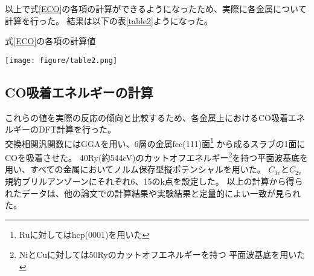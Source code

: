 \documentclass[12pt]{ltjsarticle}
\begin{document}
以上で式\ref{ECO}の各項の計算ができるようになったため、実際に各金属について計算を行った。
結果は以下の表\ref{table2}ようになった。
\begin{table}[hbtp]
    \begin{center}
    \caption{式\ref{ECO}の各項の計算値}
     \texttt{[image: figure/table2.png]}
    \end{center}
    \label{table2}
\end{table}

\subsection{CO吸着エネルギーの計算}
これらの値を実際の反応の傾向と比較するため、各金属上におけるCO吸着エネルギーのDFT計算を行った。\\
交換相関汎関数にはGGAを用い、6層の金属fcc(111)面\footnote{Ruに対してはhcp(0001)を用いた}
から成るスラブの1面にCOを吸着させた。
40Ry(約544eV)のカットオフエネルギー\footnote{NiとCuに対しては50Ryのカットオフエネルギーを持つ
平面波基底を用いた}を持つ平面波基底を用い、すべての金属においてノルム保存型擬ポテンシャルを用いた。
$C_{3v}$と$C_{2v}$規約ブリルアンゾーンにそれぞれ6、15のk点を設定した。
以上の計算から得られたデータは、他の論文での計算結果や実験結果と定量的によい一致が見られた。
\end{document}
